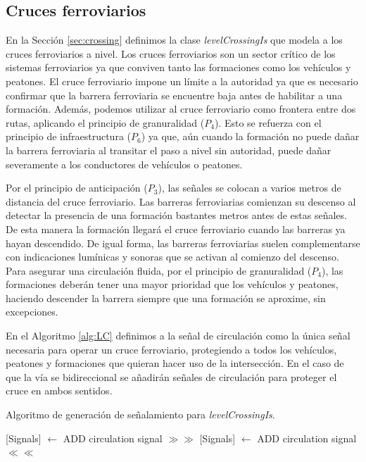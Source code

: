 \subsection{Cruces ferroviarios}

    
    En la Sección \ref{sec:crossing} definimos la clase \textit{levelCrossingIs} que modela a los cruces ferroviarios a nivel. Los cruces ferroviarios son un sector crítico de los sistemas ferroviarios ya que conviven tanto las formaciones como los vehículos y peatones. El cruce ferroviario impone un límite a la autoridad ya que es necesario confirmar que la barrera ferroviaria se encuentre baja antes de habilitar a una formación. Además, podemos utilizar al cruce ferroviario como frontera entre dos rutas, aplicando el principio de granuralidad ($P_4$). Esto se refuerza con el principio de infraestructura ($P_6$) ya que, aún cuando la formación no puede dañar la barrera ferroviaria al transitar el paso a nivel sin autoridad, puede dañar severamente a los conductores de vehículos o peatones.

    Por el principio de anticipación ($P_3$), las señales se colocan a varios metros de distancia del cruce ferroviario. Las barreras ferroviarias comienzan su descenso al detectar la presencia de una formación bastantes metros antes de estas señales. De esta manera la formación llegará el cruce ferroviario cuando las barreras ya hayan descendido. De igual forma, las barreras ferroviarias suelen complementarse con indicaciones lumínicas y sonoras que se activan al comienzo del descenso. Para asegurar una circulación fluida, por el principio de granuralidad ($P_4$), las formaciones deberán tener una mayor prioridad que los vehículos y peatones, haciendo descender la barrera siempre que una formación se aproxime, sin excepciones.

    En el Algoritmo \ref{alg:LC} definimos a la señal de circulación como la única señal necesaria para operar un cruce ferroviario, protegiendo a todos los vehículos, peatones y formaciones que quieran hacer uso de la intersección. En el caso de que la vía se bidireccional se añadirán señales de circulación para proteger el cruce en ambos sentidos.

    \begin{algorithm}[H]
        \caption{Algoritmo de generación de señalamiento para \textit{levelCrossingIs}.}\label{alg:LC}
        \DontPrintSemicolon
        \SetNoFillComment
        \LinesNotNumbered 
        {
            [Signals] $\gets$ ADD circulation signal $\gg\gg$\;
            [Signals] $\gets$ ADD circulation signal $\ll\ll$\;
        }
        \KwResult{[Signals]} 
    \end{algorithm}    
    
